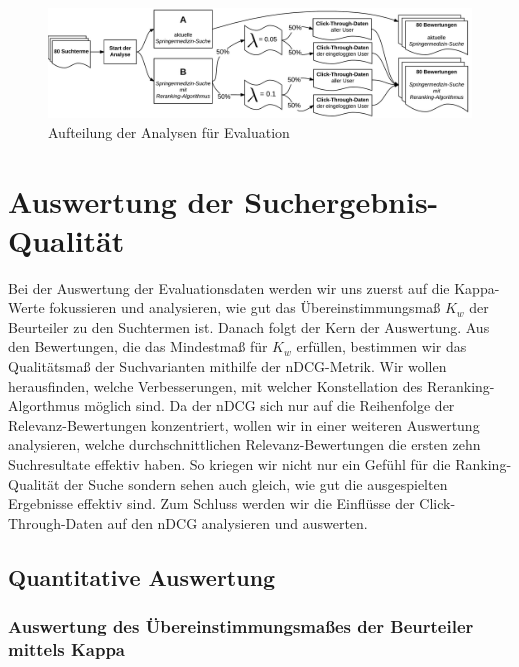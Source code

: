 \begin{figure}[H]
\centering
\vspace{-.5em}
\caption[Aufteilung der Analysen für Evaluation]{Aufteilung der Analysen für Evaluation}
\vspace{.5em}
\label{fig:AufteilungAnalysenEvaluation}
\includegraphics[width=0.9\linewidth]{gfx/EvaluationsvariantenRerankingSuche}
\vspace{-2em}
\end{figure}

\section{Auswertung der Suchergebnis-Qualität}
\label{sec:Evaluation:Auswertung}

Bei der Auswertung der Evaluationsdaten werden wir uns zuerst auf die Kappa-Werte fokussieren und analysieren, wie gut das Übereinstimmungsmaß $K_w$ der Beurteiler zu den Suchtermen ist. Danach folgt der Kern der Auswertung. Aus den Bewertungen, die das Mindestmaß für $K_w$ erfüllen, bestimmen wir das Qualitätsmaß der Suchvarianten mithilfe der nDCG-Metrik. Wir wollen herausfinden, welche Verbesserungen, mit welcher Konstellation des Reranking-Algorthmus möglich sind. Da der nDCG sich nur auf die Reihenfolge der Relevanz-Bewertungen konzentriert, wollen wir in einer weiteren Auswertung analysieren, welche durchschnittlichen Relevanz-Bewertungen die ersten zehn Suchresultate effektiv haben. So kriegen wir nicht nur ein Gefühl für die Ranking-Qualität der Suche sondern sehen auch gleich, wie gut die ausgespielten Ergebnisse effektiv sind. Zum Schluss werden wir die Einflüsse der Click-Through-Daten auf den nDCG analysieren und auswerten.

\subsection{Quantitative Auswertung}
\label{sec:Evaluation:Auswertung:QuantitativeAuswertung}

\subsubsection{Auswertung des Übereinstimmungsmaßes der Beurteiler mittels Kappa}
\label{sec:Evaluation:Auswertung:QuantitativeAuswertung:Kappa}

